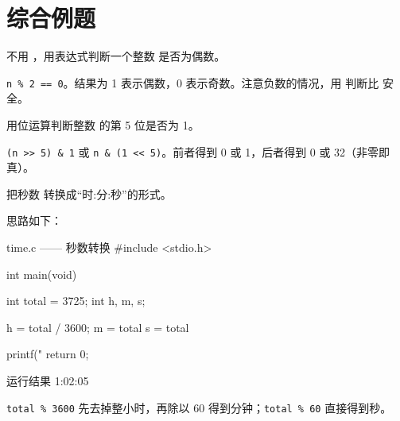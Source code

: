 \section{综合例题}

\begin{example}
不用 ，用表达式判断一个整数  是否为偶数。
\end{example}
\begin{solution}
\texttt{n \% 2 == 0}。结果为 1 表示偶数，0 表示奇数。注意负数的情况，用  判断比  安全。
\end{solution}

\begin{example}
用位运算判断整数  的第 5 位是否为 1。
\end{example}
\begin{solution}
\texttt{(n >> 5) \& 1} 或 \texttt{n \& (1 << 5)}。前者得到 0 或 1，后者得到 0 或 32（非零即真）。
\end{solution}

\begin{example}
把秒数  转换成“时:分:秒”的形式。
\end{example}
\begin{solution}
思路如下：

\begin{codebox}{time.c —— 秒数转换}
#include <stdio.h>

int main(void)
{
    int total = 3725;
    int h, m, s;

    h = total / 3600;
    m = total %
    s = total %

    printf("%
    return 0;
}
\end{codebox}

\begin{outbox}{运行结果}
1:02:05
\end{outbox}

\texttt{total \% 3600} 先去掉整小时，再除以 60 得到分钟；\texttt{total \% 60} 直接得到秒。
\end{solution}

